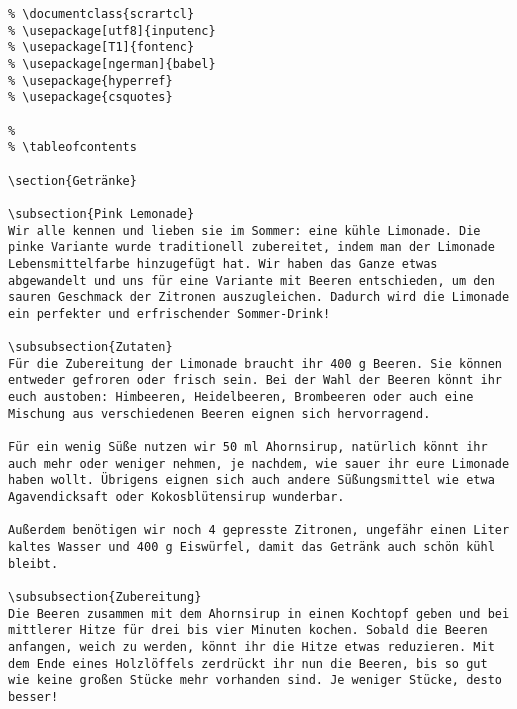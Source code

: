 \begin{verbatim}
% \documentclass{scrartcl}
% \usepackage[utf8]{inputenc}
% \usepackage[T1]{fontenc}
% \usepackage[ngerman]{babel}
% \usepackage{hyperref}
% \usepackage{csquotes}
	
% 
% \tableofcontents
	
\section{Getränke}
	
\subsection{Pink Lemonade}
Wir alle kennen und lieben sie im Sommer: eine kühle Limonade. Die pinke Variante wurde traditionell zubereitet, indem man der Limonade Lebensmittelfarbe hinzugefügt hat. Wir haben das Ganze etwas abgewandelt und uns für eine Variante mit Beeren entschieden, um den sauren Geschmack der Zitronen auszugleichen. Dadurch wird die Limonade ein perfekter und erfrischender Sommer-Drink!
	
\subsubsection{Zutaten}
Für die Zubereitung der Limonade braucht ihr 400 g Beeren. Sie können entweder gefroren oder frisch sein. Bei der Wahl der Beeren könnt ihr euch austoben: Himbeeren, Heidelbeeren, Brombeeren oder auch eine Mischung aus verschiedenen Beeren eignen sich hervorragend. 
	
Für ein wenig Süße nutzen wir 50 ml Ahornsirup, natürlich könnt ihr auch mehr oder weniger nehmen, je nachdem, wie sauer ihr eure Limonade haben wollt. Übrigens eignen sich auch andere Süßungsmittel wie etwa Agavendicksaft oder Kokosblütensirup wunderbar.
	
Außerdem benötigen wir noch 4 gepresste Zitronen, ungefähr einen Liter kaltes Wasser und 400 g Eiswürfel, damit das Getränk auch schön kühl bleibt.
	
\subsubsection{Zubereitung}
Die Beeren zusammen mit dem Ahornsirup in einen Kochtopf geben und bei mittlerer Hitze für drei bis vier Minuten kochen. Sobald die Beeren anfangen, weich zu werden, könnt ihr die Hitze etwas reduzieren. Mit dem Ende eines Holzlöffels zerdrückt ihr nun die Beeren, bis so gut wie keine großen Stücke mehr vorhanden sind. Je weniger Stücke, desto besser!
	

\end{verbatim}
